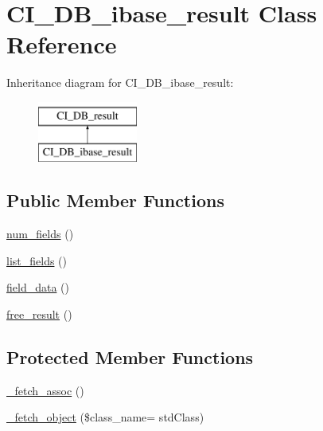 \hypertarget{class_c_i___d_b__ibase__result}{}\section{C\+I\+\_\+\+D\+B\+\_\+ibase\+\_\+result Class Reference}
\label{class_c_i___d_b__ibase__result}
Inheritance diagram for C\+I\+\_\+\+D\+B\+\_\+ibase\+\_\+result\+:\begin{figure}[H]
\begin{center}
\leavevmode
\includegraphics[height=2.000000cm]{class_c_i___d_b__ibase__result}
\end{center}
\end{figure}
\subsection*{Public Member Functions}
\begin{DoxyCompactItemize}
\item 
\hyperlink{class_c_i___d_b__ibase__result_af831bf363e4d7d661a717a4932af449d}{num\+\_\+fields} ()
\item 
\hyperlink{class_c_i___d_b__ibase__result_a50b54eb4ea7cfd039740f532988ea776}{list\+\_\+fields} ()
\item 
\hyperlink{class_c_i___d_b__ibase__result_a84bffd65e53902ade1591716749a33e3}{field\+\_\+data} ()
\item 
\hyperlink{class_c_i___d_b__ibase__result_aad2d98d6beb3d6095405356c6107b473}{free\+\_\+result} ()
\end{DoxyCompactItemize}
\subsection*{Protected Member Functions}
\begin{DoxyCompactItemize}
\item 
\hyperlink{class_c_i___d_b__ibase__result_a43a9a92817f1334a1c10752ec44275a0}{\+\_\+fetch\+\_\+assoc} ()
\item 
\hyperlink{class_c_i___d_b__ibase__result_ac0acae0a13c8bfe4c34198813ecf43a0}{\+\_\+fetch\+\_\+object} (\$class\+\_\+name= \textquotesingle{}std\+Class\textquotesingle{})
\end{DoxyCompactItemize}
